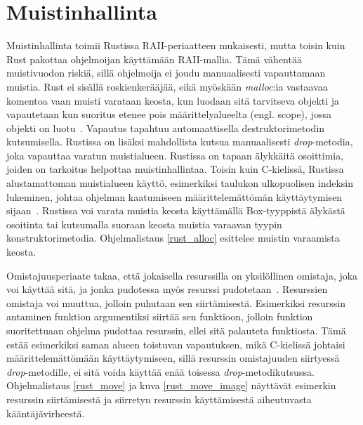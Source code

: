 \begin{minipage}{\linewidth}

\end{minipage}

\begin{minipage}{\linewidth}

\end{minipage}

\section{Muistinhallinta}
Muistinhallinta toimii Rustissa RAII-periaatteen mukaisesti, mutta toisin kuin \Cpp Rust pakottaa ohjelmoijan käyttämään RAII-mallia. Tämä vähentää muistivuodon riskiä, sillä ohjelmoija ei joudu manuaalisesti vapauttamaan muistia. Rust ei sisällä roskienkerääjää, eikä myöskään \textit{malloc}:ia vastaavaa komentoa vaan muisti varataan keosta, kun luodaan sitä tarvitseva objekti ja vapautetaan kun suoritus etenee pois määrittelyalueelta (engl. scope), jossa objekti on luotu~\cite[chapter~4.1]{rustbook}. Vapautus tapahtuu automaattisella destruktorimetodin kutsumisella. Rustissa on lisäksi mahdollista kutsua manuaalisesti \textit{drop}-metodia, joka vapauttaa varatun muistialueen. Rustissa on \Cpp tapaan älykkäitä osoittimia, joiden on tarkoitus helpottaa muistinhallintaa. Toisin kuin C-kielissä, Rustissa alustamattoman muistialueen käyttö, esimerkiksi taulukon ulkopuolisen indeksin lukeminen, johtaa ohjelman kaatumiseen määrittelemättömän käyttäytymisen sijaan~\cite[chapter~9.1]{rustbook}.  Rustissa voi varata muistia keosta käyttämällä Box-tyyppistä älykästä osoitinta tai kutsumalla suoraan keosta muistia varaavan tyypin konstruktorimetodia. Ohjelmalistaus \ref{rust_alloc} esittelee muistin varaamista keosta.

\begin{minipage}{\linewidth}

\end{minipage}

Omistajuusperiaate takaa, että jokaisella resurssilla on yksilöllinen omistaja, joka voi käyttää sitä, ja jonka pudotessa myös resurssi pudotetaan~\cite[p.~147]{10.1145/3418295}. Resurssien omistaja voi muuttua, jolloin puhutaan sen siirtämisestä. Esimerkiksi resurssin antaminen funktion argumentiksi siirtää sen funktioon, jolloin funktion suoritettuaan ohjelma pudottaa resurssin, ellei sitä palauteta funktiosta. Tämä estää esimerkiksi saman alueen toistuvan vapautuksen, mikä C-kielissä johtaisi määrittelemättömään käyttäytymiseen, sillä resurssin omistajuuden siirtyessä \textit{drop}-metodille, ei sitä voida käyttää enää toisessa \textit{drop}-metodikutsussa. Ohjelmalistaus \ref{rust_move} ja kuva \ref{rust_move_image} näyttävät esimerkin resurssin siirtämisestä ja siirretyn resurssin käyttämisestä aiheutuvasta kääntäjävirheestä.

